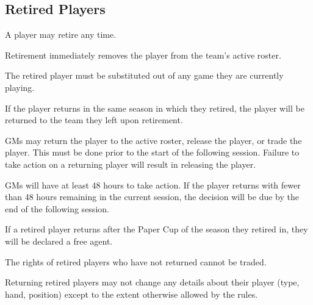\subsection{Retired Players}
\begin{deepEnumerate}
	\item A player may retire any time.
	\begin{deepEnumerate}
		\item Retirement immediately removes the player from the team’s active roster.
		\item The retired player must be substituted out of any game they are currently playing.
	\end{deepEnumerate}
	\item If the player returns in the same season in which they retired, the player will be returned to the team they left upon retirement.
	\begin{deepEnumerate}
		\item GMs may return the player to the active roster, release the player, or trade the player. This must be done prior to the start of the
		following session. Failure to take action on a returning player will result in releasing the player.
		\begin{deepEnumerate}
			\item GMs will have at least 48 hours to take action. If the player returns with fewer than 48 hours remaining in the current session,
			the decision will be due by the end of the following session.
		\end{deepEnumerate}
	\end{deepEnumerate}
	\item If a retired player returns after the Paper Cup of the season they retired in, they will be declared a free agent.
	\item The rights of retired players who have not returned cannot be traded.
	\item Returning retired players may not change any details about their player (type, hand, position) except to the extent otherwise allowed by the rules.
\end{deepEnumerate}

